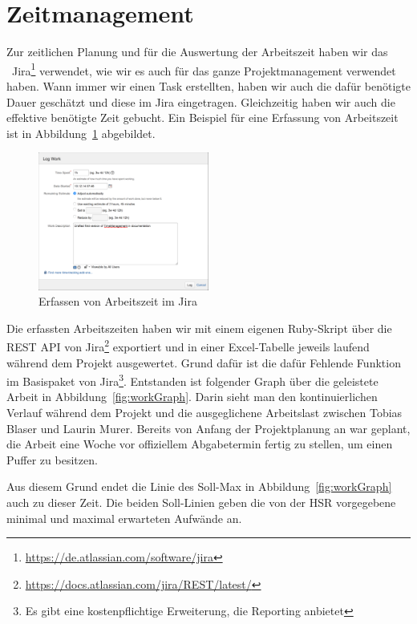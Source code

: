 \chapter*{Zeitmanagement}
	Zur zeitlichen Planung und für die Auswertung der Arbeitszeit haben wir das \ppt\ Jira\footnote{\url{https://de.atlassian.com/software/jira}} verwendet,
	wie wir es auch für das ganze Projektmanagement verwendet haben.
	Wann immer wir einen Task erstellten, haben wir auch die dafür benötigte Dauer geschätzt
	und diese im Jira eingetragen.
	Gleichzeitig haben wir auch die effektive benötigte Zeit gebucht.
	Ein Beispiel für eine Erfassung von Arbeitszeit ist in Abbildung\ \ref{fig:logWork} abgebildet.
	
	\begin{figure}[H]
		\includegraphics[width=0.5\textwidth]{projectPlan/media/img/logWork.png}
		\centering
		\caption{Erfassen von Arbeitszeit im Jira}
		\label{fig:logWork}
	\end{figure}
	
	Die erfassten Arbeitszeiten haben wir mit einem eigenen Ruby-Skript über die REST API von Jira\footnote{\url{https://docs.atlassian.com/jira/REST/latest/}} exportiert
	und in einer Excel-Tabelle jeweils laufend während dem Projekt ausgewertet.
	Grund dafür ist die dafür Fehlende Funktion im Basispaket von Jira\footnote{Es gibt eine kostenpflichtige Erweiterung, die Reporting anbietet}.
	Entstanden ist folgender Graph über die geleistete Arbeit in Abbildung\ \ref{fig:workGraph}.
	Darin sieht man den kontinuierlichen Verlauf während dem Projekt
	und die ausgeglichene Arbeitslast zwischen Tobias Blaser und Laurin Murer.
	Bereits von Anfang der Projektplanung an war geplant, die Arbeit eine Woche vor offiziellem Abgabetermin fertig zu stellen, um einen Puffer zu besitzen.
	
	Aus diesem Grund endet die Linie des Soll-Max in Abbildung\ \ref{fig:workGraph} auch zu dieser Zeit.
	Die beiden Soll-Linien geben die von der HSR vorgegebene minimal und maximal erwarteten Aufwände an.
	
